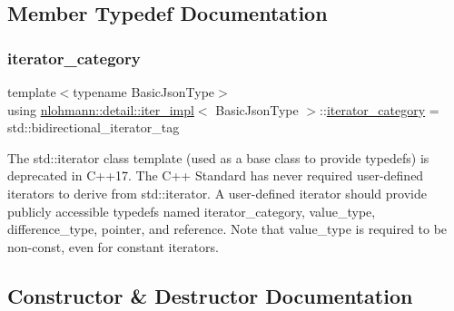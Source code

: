 \subsection{Member Typedef Documentation}
\mbox{\label{classnlohmann_1_1detail_1_1iter__impl_ad9e091f5c70b34b5b1abc1ab15fd9106}} 
\subsubsection{\texorpdfstring{iterator\+\_\+category}{iterator\_category}}
{\footnotesize\ttfamily template$<$typename Basic\+Json\+Type$>$ \\
using \hyperlink{classnlohmann_1_1detail_1_1iter__impl}{nlohmann\+::detail\+::iter\+\_\+impl}$<$ Basic\+Json\+Type $>$\+::\hyperlink{classnlohmann_1_1detail_1_1iter__impl_ad9e091f5c70b34b5b1abc1ab15fd9106}{iterator\+\_\+category} =  std\+::bidirectional\+\_\+iterator\+\_\+tag}

The std\+::iterator class template (used as a base class to provide typedefs) is deprecated in C++17. The C++ Standard has never required user-\/defined iterators to derive from std\+::iterator. A user-\/defined iterator should provide publicly accessible typedefs named iterator\+\_\+category, value\+\_\+type, difference\+\_\+type, pointer, and reference. Note that value\+\_\+type is required to be non-\/const, even for constant iterators. 

\subsection{Constructor \& Destructor Documentation}
\mbox{\label{classnlohmann_1_1detail_1_1iter__impl_a19aa457f9c4af1b7e3af59839132cc5c}} 
